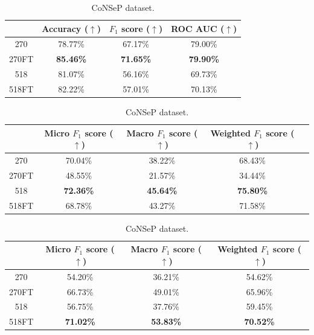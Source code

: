 \begin{table}[ht]
    \centering
    \caption{Result of the Scaling CNNs experiment.}

    \begin{tabular}{c|c|c|c|}
  \cline{2-4}
  & Accuracy ($\uparrow$) & $F_1$ score ($\uparrow$) & ROC AUC ($\uparrow$)  \\ \hline
\multicolumn{1}{|c|}{270}  & 78.77\% & 67.17\% & 79.00\% \\ \hline
\multicolumn{1}{|c|}{270FT}  & \textbf{85.46\%} & \textbf{71.65\%} & \textbf{79.90\%} \\ \hline
\multicolumn{1}{|c|}{518}  & 81.07\% & 56.16\% & 69.73\% \\ \hline
\multicolumn{1}{|c|}{518FT}  & 82.22\% & 57.01\% & 70.13\% \\ \hline
\end{tabular}
\caption{DigiPatics lung dataset.}

\vspace{0.5cm}

\begin{tabular}{c|c|c|c|c|}
  \cline{2-4}
  & Micro $F_1$ score ($\uparrow$) & Macro $F_1$ score ($\uparrow$) & Weighted $F_1$ score ($\uparrow$) \\ \hline
\multicolumn{1}{|c|}{270}  & 70.04\% & 38.22\% & 68.43\%  \\ \hline
\multicolumn{1}{|c|}{270FT}  & 48.55\% & 21.57\% & 34.44\% \\ \hline
\multicolumn{1}{|c|}{518}  & \textbf{72.36\%} & \textbf{45.64\%} & \textbf{75.80\%} \\ \hline
\multicolumn{1}{|c|}{518FT}  & 68.78\% & 43.27\% & 71.58\% \\ \hline
\end{tabular}
\caption{DigiPatics breast dataset.}

\vspace{0.5cm}

    \begin{tabular}{c|c|c|c|}
  \cline{2-4}
  & Micro $F_1$ score ($\uparrow$) & Macro $F_1$ score ($\uparrow$) & Weighted $F_1$ score ($\uparrow$) \\ \hline
\multicolumn{1}{|c|}{270}  & 54.20\% & 36.21\% & 54.62\% \\ \hline
\multicolumn{1}{|c|}{270FT}  & 66.73\% & 49.01\% & 65.96\% \\ \hline
\multicolumn{1}{|c|}{518}  & 56.75\% & 37.76\% & 59.45\% \\ \hline
\multicolumn{1}{|c|}{518FT}  & \textbf{71.02\%} & \textbf{53.83\%} & \textbf{70.52\%} \\ \hline
\end{tabular}
\caption{CoNSeP dataset.}
\label{tab:consep-scaling}


\end{table}
